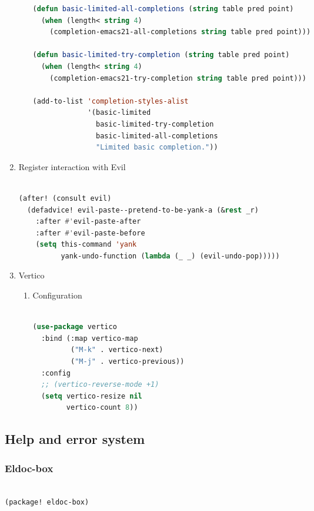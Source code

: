 \documentclass[11pt]{article}
\begin{document}
\begin{enumerate}
\begin{enumerate}
\begin{lstlisting}[language=Lisp]
(defun basic-limited-all-completions (string table pred point)
  (when (length< string 4)
    (completion-emacs21-all-completions string table pred point)))

(defun basic-limited-try-completion (string table pred point)
  (when (length< string 4)
    (completion-emacs21-try-completion string table pred point)))

(add-to-list 'completion-styles-alist
             '(basic-limited
               basic-limited-try-completion
               basic-limited-all-completions
               "Limited basic completion."))
\end{lstlisting}
\end{enumerate}

  \item Register interaction with Evil
  \label{sec:register-interaction-with-evil}

  \begin{lstlisting}[language=Lisp]%! Someone please complete this list for me

(after! (consult evil)
  (defadvice! evil-paste--pretend-to-be-yank-a (&rest _r)
    :after #'evil-paste-after
    :after #'evil-paste-before
    (setq this-command 'yank
          yank-undo-function (lambda (_ _) (evil-undo-pop)))))
\end{lstlisting}
  \item Vertico
  \label{sec:vertico}

  
\begin{enumerate}
  \item Configuration
  \label{sec:configuration-3}

  \begin{lstlisting}[language=Lisp]%! Someone please complete this list for me

(use-package vertico
  :bind (:map vertico-map
         ("M-k" . vertico-next)
         ("M-j" . vertico-previous))
  :config
  ;; (vertico-reverse-mode +1)
  (setq vertico-resize nil
        vertico-count 8))
\end{lstlisting}
\end{enumerate}

\end{enumerate}


\subsection{Help and error system}
\label{sec:help-and-error-system}


\subsubsection{Eldoc-box}
\label{sec:eldoc-box}
\begin{lstlisting}[language=Lisp]%! Someone please complete this list for me

(package! eldoc-box)
\end{lstlisting}
\end{document}
